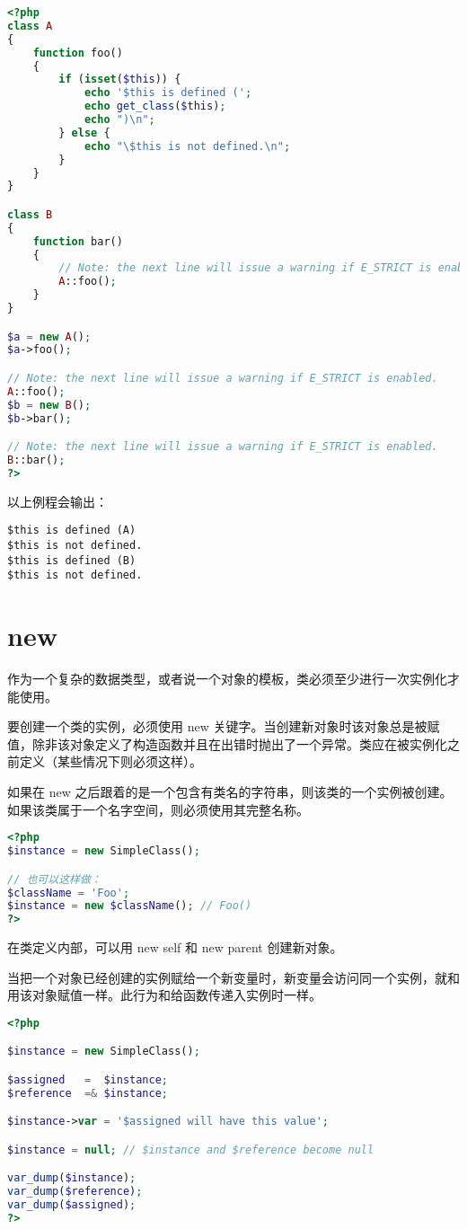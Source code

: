 \begin{lstlisting}[language=PHP]
<?php
class A
{
    function foo()
    {
        if (isset($this)) {
            echo '$this is defined (';
            echo get_class($this);
            echo ")\n";
        } else {
            echo "\$this is not defined.\n";
        }
    }
}

class B
{
    function bar()
    {
        // Note: the next line will issue a warning if E_STRICT is enabled.
        A::foo();
    }
}

$a = new A();
$a->foo();

// Note: the next line will issue a warning if E_STRICT is enabled.
A::foo();
$b = new B();
$b->bar();

// Note: the next line will issue a warning if E_STRICT is enabled.
B::bar();
?>
\end{lstlisting}

以上例程会输出：

\begin{verbatim}
$this is defined (A)
$this is not defined.
$this is defined (B)
$this is not defined.
\end{verbatim}


\section{new}

作为一个复杂的数据类型，或者说一个对象的模板，类必须至少进行一次实例化才能使用。

要创建一个类的实例，必须使用 new 关键字。当创建新对象时该对象总是被赋值，除非该对象定义了构造函数并且在出错时抛出了一个异常。类应在被实例化之前定义（某些情况下则必须这样）。

如果在 new 之后跟着的是一个包含有类名的字符串，则该类的一个实例被创建。如果该类属于一个名字空间，则必须使用其完整名称。



\begin{lstlisting}[language=PHP]
<?php
$instance = new SimpleClass();

// 也可以这样做：
$className = 'Foo';
$instance = new $className(); // Foo()
?>
\end{lstlisting}

在类定义内部，可以用 new self 和 new parent 创建新对象。

当把一个对象已经创建的实例赋给一个新变量时，新变量会访问同一个实例，就和用该对象赋值一样。此行为和给函数传递入实例时一样。


\begin{lstlisting}[language=PHP]
<?php

$instance = new SimpleClass();

$assigned   =  $instance;
$reference  =& $instance;

$instance->var = '$assigned will have this value';

$instance = null; // $instance and $reference become null

var_dump($instance);
var_dump($reference);
var_dump($assigned);
?>
\end{lstlisting}

